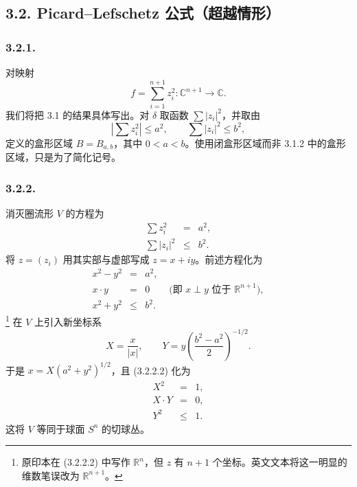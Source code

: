 \subsection*{3.2. Picard--Lefschetz 公式（超越情形）}

\subsubsection*{3.2.1.}
对映射
\[
f=\sum_{i=1}^{n+1}z_i^2:\mathbb C^{n+1}\longrightarrow\mathbb C.
\]
我们将把 3.1 的结果具体写出。对 $\delta$ 取函数 $\sum |z_i|^2$，并取由
\[
\left|\sum z_i^2\right|\leq a^2,
\qquad
\sum |z_i|^2\leq b^2,
\]
定义的盒形区域 $B=B_{a,b}$，其中 $0<a<b$。使用闭盒形区域而非 3.1.2 中的盒形区域，只是为了简化记号。

\subsubsection*{3.2.2.}
消灭圈流形 $V$ 的方程为
\begin{equation}\tag{3.2.2.1}
\begin{array}{rcl}
\displaystyle\sum z_i^2&=&a^2,\\
\displaystyle\sum |z_i|^2&\leq&b^2.
\end{array}
\end{equation}
将 $z=(z_i)$ 用其实部与虚部写成 $z=x+iy$。前述方程化为
\begin{equation}\tag{3.2.2.2}
\begin{array}{rcl}
x^2-y^2&=&a^2,\\
x\mathbin{\cdot}y&=&0
  \qquad\bigl(\text{即 }x\perp y\text{ 位于 }\mathbb R^{n+1}\bigr),\\
x^2+y^2&\leq&b^2.
\end{array}
\end{equation}
\footnote{原印本在 (3.2.2.2) 中写作 $\mathbb R^n$，但 $z$ 有 $n+1$ 个坐标。英文文本将这一明显的维数笔误改为 $\mathbb R^{n+1}$。}
在 $V$ 上引入新坐标系
\[
X=\frac{x}{|x|},
\qquad
Y=y\left(\frac{b^2-a^2}{2}\right)^{-1/2}.
\]
于是 $x=X(a^2+y^2)^{1/2}$，且 (3.2.2.2) 化为
\begin{equation}\tag{3.2.2.3}
\begin{array}{rcl}
X^2&=&1,\\
X\mathbin{\cdot}Y&=&0,\\
Y^2&\leq&1.
\end{array}
\end{equation}
这将 $V$ 等同于球面 $S^n$ 的切球丛。

